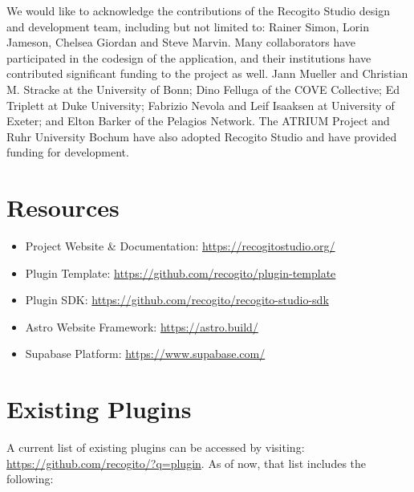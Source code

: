 \documentclass[final]{anthology-ch}         %
\begin{document}
We would like to acknowledge the contributions of the Recogito Studio design and development team, including but not limited to: Rainer Simon, Lorin Jameson, Chelsea Giordan and Steve Marvin. Many collaborators have participated in the codesign of the application, and their institutions have contributed significant funding to the project as well. Jann Mueller and Christian M. Stracke at the University of Bonn; Dino Felluga of the COVE Collective; Ed Triplett at Duke University; Fabrizio Nevola and Leif Isaaksen at University of Exeter; and Elton Barker of the Pelagios Network. The ATRIUM Project and Ruhr University Bochum have also adopted Recogito Studio and have provided funding for development.

\printbibliography

\appendix

\section{Resources} \label{appdx:first_appendix_resources}
\begin{itemize}
  \item Project Website \& Documentation: \url{https://recogitostudio.org/}
  \item Plugin Template: \url{https://github.com/recogito/plugin-template}
  \item Plugin SDK: \url{https://github.com/recogito/recogito-studio-sdk}
  \item Astro Website Framework: \url{https://astro.build/}
  \item Supabase Platform: \url{https://www.supabase.com/}
\end{itemize}

\section{Existing Plugins} \label{appdx:second_appendix_plugins}

A current list of existing plugins can be accessed by visiting: \href{https://github.com/recogito/?q=plugin}{https://github.com/recogito/?q=plugin}. As of now, that list includes the following:
\end{document}
